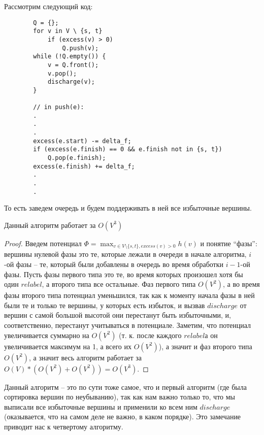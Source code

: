 \begin{algorithm}
    Рассмотрим следующий код:
    \begin{lstlisting}
        Q = {};
        for v in V \ {s, t}
            if (excess(v) > 0)
                Q.push(v);
        while (!Q.empty()) {
            v = Q.front();
            v.pop();
            discharge(v);
        }

        // in push(e):
        .
        .
        .
        excess(e.start) -= delta_f;
        if (excess(e.finish) == 0 && e.finish not in {s, t})
            Q.pop(e.finish);
        excess(e.finish) += delta_f;
        .
        .
        .
    \end{lstlisting}

    То есть заведем очередь и будем поддерживать в ней все избыточные вершины.
\end{algorithm}

\begin{proposition}
    Данный алгоритм работает за $O(V^3)$
\end{proposition}

\begin{proof}
    Введем потенциал $\Phi = \max_{v \in V \setminus \{s, t\}, excess(v) > 0} h(v)$ и понятие ``фазы'': вершины нулевой фазы это те, которые лежали в очереди в начале алгоритма, $i$-ой фазы -- те, который были добавлены в очередь во время обработки $i-1$-ой фазы. Пусть фазы первого типа это те, во время которых произошел хотя бы один $relabel$, а второго типа все остальные. Фаз первого типа $O(V^2)$, а во время фазы второго типа потенциал уменьшился, так как к моменту начала фазы в ней были те и только те вершины, у которых есть избыток, и вызвав $discharge$ от вершин с самой большой высотой они перестанут быть избыточными, и, соответственно, перестанут учитываться в потенциале. Заметим, что потенциал увеличивается суммарно на $O(V^2)$ (т. к. после каждого $relabel$а он увеличивается максимум на 1, а всего их $O(V^2)$), а значит и фаз второго типа $O(V^2)$, а значит весь алгоритм работает за $O(V) * (O(V^2) + O(V^2)) = O(V^3)$.
\end{proof}

\begin{note}
    Данный алгоритм -- это по сути тоже самое, что и первый алгоритм (где была сортировка вершин по неубыванию), так как нам важно только то, что мы выписали все избыточные вершины и применили ко всем ним $discharge$ (оказывается, что на самом деле не важно, в каком порядке). Это замечание приводит нас к четвертому алгоритму.
\end{note}

